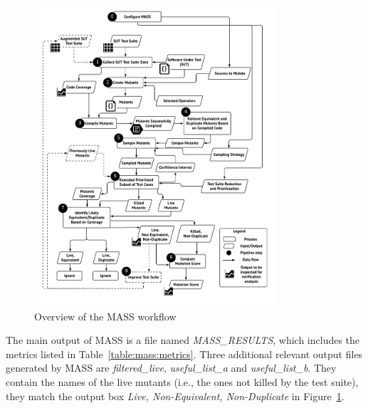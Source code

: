 \begin{figure}[tb]
\begin{center}
\includegraphics[width=0.8\textwidth]{images/MASS-extended.pdf}
\caption{Overview of the MASS workflow}
\label{fig:MASS}
\end{center}
\end{figure}



The main output of MASS is a file named \emph{MASS\_RESULTS}, which includes the metrics listed in Table~\ref{table:mass:metrics}.
Three additional relevant output files generated by MASS are \emph{filtered\_live}, \emph{useful\_list\_a} and \emph{useful\_list\_b}. They contain the names of the live mutants (i.e., the ones not killed by the test suite), they match the output box \emph{Live, Non-Equivalent, Non-Duplicate} in Figure~\ref{fig:MASS}.


